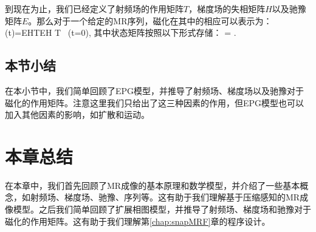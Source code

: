  到现在为止，我们已经定义了射频场的作用矩阵$T$，梯度场的失相矩阵$H$以及驰豫矩阵$E$。那么对于一个给定的MR序列，磁化在其中的相应可以表示为：
 \beq \Gamma(t)=\cdots E\cdot H\cdot T\cdot E\cdot H
 \cdot T \cdot \Gamma\ (t=0),\eeq 
 其中状态矩阵按照以下形式存储：
 \beq 
 \Gamma=
 .
 \eeq 

\subsection{本节小结}
在本小节中，我们简单回顾了EPG模型，并推导了射频场、梯度场以及驰豫对于磁化的作用矩阵。注意这里我们只给出了这三种因素的作用，但EPG模型也可以加入其他因素的影响，如扩散和运动。

\section{本章总结}
在本章中，我们首先回顾了MR成像的基本原理和数学模型，并介绍了一些基本概念，如射频场、梯度场、驰豫、序列等。这有助于我们理解基于压缩感知的MR成像模型。之后我们简单回顾了扩展相图模型，并推导了射频场、梯度场和驰豫对于磁化的作用矩阵。这有助于我们理解第\ref{chap:snapMRF}章的程序设计。














